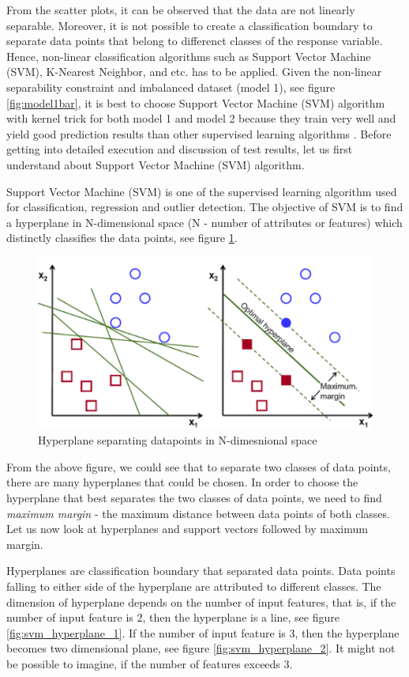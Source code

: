 \documentclass[format=sigconf]{acmart}
\begin{document}
From the scatter plots, it can be observed that the data are not linearly separable. Moreover, it is not possible to create a classification 
boundary to separate data points that belong to differenct classes of the response variable. Hence, non-linear classification 
algorithms such as Support Vector Machine (SVM), K-Nearest Neighbor, and etc. has to be applied. Given the non-linear 
separability constraint and imbalanced dataset (model 1), see figure \ref{fig:model1bar}, it is best to choose Support Vector Machine (SVM) 
algorithm with kernel trick for both model 1 and model 2 because they train very well and yield good prediction results than other supervised learning 
algorithms \cite{imam2006z}. Before getting into detailed execution and discussion of test results, let us first understand about 
Support Vector Machine (SVM) algorithm.

Support Vector Machine (SVM) is one of the supervised learning algorithm used for classification, regression and outlier detection.
The objective of SVM is to find a hyperplane in N-dimensional space (N - number of attributes or features) which distinctly classifies
the data points, see figure \ref{fig:svm_1}.
\begin{figure}[H]
    \centering
    \includegraphics[scale=0.25]{images/svm_1.png}
    \caption{Hyperplane separating datapoints in N-dimesnional space}
    \label{fig:svm_1}
\end{figure}
From the above figure, we could see that to separate two classes of data points, there are many hyperplanes that could be chosen.
In order to choose the hyperplane that best separates the two classes of data points, we need to find \textit{maximum margin} - the
maximum distance between data points of both classes. Let us now look at hyperplanes and support vectors followed by maximum margin.

Hyperplanes are classification boundary that separated data points. Data points falling to either side of the hyperplane are 
attributed to different classes. The dimension of hyperplane depends on the number of input features, that is, if the number of 
input feature is 2, then the hyperplane is a line, see figure \ref{fig:svm_hyperplane_1}. If the number of input feature is 3, then 
the hyperplane becomes two dimensional plane, see figure \ref{fig:svm_hyperplane_2}. It might not be possible to imagine, if the 
number of features exceeds 3.
\end{document}
